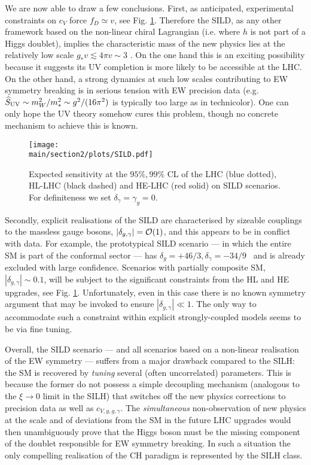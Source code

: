We are now able to draw a few conclusions. First, as anticipated, experimental constraints on $c_V$ force $f_D\simeq v$, see Fig. \ref{SILD}. Therefore the SILD, as any other framework based on the non-linear chiral Lagrangian (i.e. where $h$ is not part of a Higgs doublet), implies the characteristic mass of the new physics lies at the relatively low scale $g_*v\lesssim4\pi v\sim3$ \UTeV. On the one hand this is an exciting possibility because it suggests its UV completion is more likely to be accessible at the LHC. On the other hand, a strong dynamics at such low scales contributing to EW symmetry breaking is in serious tension with EW precision data (e.g. $\widehat S_{\rm UV}\sim m_W^2/m_*^2\sim g^2/(16\pi^2)$ is typically too large as in technicolor). One can only hope the UV theory somehow cures this problem, though no concrete mechanism to achieve this is known.


\begin{figure}[t]
\begin{center}
\texttt{[image: \\main/section2/plots/SILD.pdf]}
\caption{Expected sensitivity at the $95\%, 99\%$ CL of the LHC (blue dotted), HL-LHC (black dashed) and HE-LHC (red solid) on SILD scenarios. For definiteness we set $\delta_\gamma=\gamma_y=0$.
}\label{SILD}
\end{center}
\end{figure}


Secondly, explicit realisations of the SILD are characterised by sizeable couplings to the massless gauge bosons, $|\delta_{g,\gamma}|={\cal O}(1)$, and this appears to be in conflict with data. For example, the prototypical SILD scenario --- in which the entire SM is part of the conformal sector --- has $\delta_{g}=+46/3, \delta_\gamma=-34/9$~\cite{Goldberger:2008zz} and is already excluded with large confidence. Scenarios with partially composite SM, $|\delta_{g,\gamma}|\sim0.1$, will be subject to the significant constraints from the HL and HE upgrades, see Fig. \ref{SILD}. Unfortunately, even in this case there is no known symmetry argument that may be invoked to ensure $|\delta_{g,\gamma}|\ll1$. The only way to accommodate such a constraint within explicit strongly-coupled models seems to be via fine tuning.





Overall, the SILD scenario --- and all scenarios based on a non-linear realisation of the EW symmetry --- suffers from a major drawback compared to the SILH: the SM is recovered by {\emph{tuning}} several (often uncorrelated) parameters. This is because the former do not possess a simple decoupling mechanism (analogous to the $\xi\to0$ limit in the SILH) that switches off the new physics corrections to precision data as well as $c_{V,y,g,\gamma}$. The {\emph{simultaneous}} non-observation of new physics at the \UTeV scale and of deviations from the SM in the future LHC upgrades would then unambiguously prove that the Higgs boson must be the missing component of the doublet responsible for EW symmetry breaking. In such a situation the only compelling realisation of the CH paradigm is represented by the SILH class.




